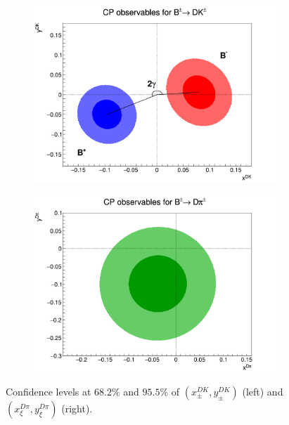 \documentclass[12pt, a4paper, notitlepage, onecolumn]{article}
\begin{document}
\begin{figure}[H] 
  \centering
  \begin{subfigure}{0.50\textwidth}
    \centering
    \includegraphics[width=1\textwidth]{Plots/CPContours.png}
  \end{subfigure}%
  \begin{subfigure}{0.50\textwidth}
    \centering
    \includegraphics[width=1\textwidth]{Plots/CPXiContours.png}
  \end{subfigure}
  \caption{Confidence levels at $68.2\%$ and $95.5\%$ of $(x_\pm^{DK}, y_\pm^{DK})$ (left) and $(x_\xi^{D\pi}, y_\xi^{D\pi})$ (right).}
  \label{fig_cp_observables}
\end{figure}

\end{document}
